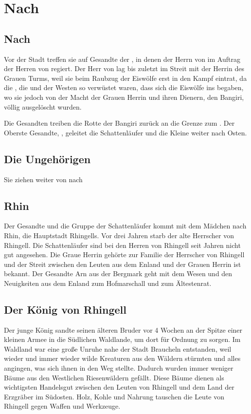 \chapter{Nach \Rhingell}

\section{Nach \Mundis}
Vor der Stadt \Mundis treffen sie auf Gesandte der \Nordmark, in denen der Herrn von \Bornhold im Auftrag der Herren von \Rhingell regiert.
Der Herr von \Bornhold lag bis zuletzt im Streit mit der Herrin des Grauen Turms, weil sie beim Raubzug der Eiswölfe erst in den Kampf  eintrat, da die \Nordmark, die \Bergmark und der Westen  so verwüstet waren, dass sich die Eiswölfe ins \Enland begaben, wo sie jedoch von der Macht der Grauen Herrin und ihren Dienern, den Bangiri, völlig ausgelöscht wurden. 

Die Gesandten treiben die Rotte der Bangiri zurück an die Grenze zum \Enland. Der Oberste Gesandte, \Arn, geleitet die Schattenläufer und die Kleine weiter nach Osten.

\section{Die Ungehörigen}

Sie ziehen weiter von \Mundis nach \Helim

\section{Rhin}

Der Gesandte und die Gruppe der Schattenläufer kommt mit dem Mädchen nach Rhin, die Hauptstadt Rhingells. Vor drei Jahren starb der alte Herrscher von Rhingell. Die Schattenläufer sind bei den Herren von Rhingell seit Jahren nicht gut angesehen. Die Graue Herrin gehörte zur Familie der Herrscher von Rhingell und der Streit zwischen den Leuten aus dem Enland und der Grauen Herrin ist bekannt. Der Gesandte Arn aus der Bergmark geht mit dem Wesen und den Neuigkeiten aus dem Enland zum Hofmarschall und zum Ältestenrat.

\section{Der König von Rhingell}
Der junge König sandte seinen älteren Bruder vor 4 Wochen an der Spitze einer kleinen Armee in die Südlichen Waldlande, um dort für Ordnung zu sorgen. Im Waldland war eine große Unruhe nahe der Stadt Braucheln entstanden, weil wieder und immer wieder wilde Kreaturen aus den Wäldern stürmten und alles angingen, was sich ihnen in den Weg stellte. Dadurch wurden immer weniger Bäume aus den Westlichen Riesenwäldern gefällt. Diese Bäume dienen als wichtigsten Handelsgut zwischen den Leuten von Rhingell und dem Land der Erzgräber im Südosten. Holz, Kohle und Nahrung tauschen die Leute von Rhingell gegen Waffen und Werkzeuge.

